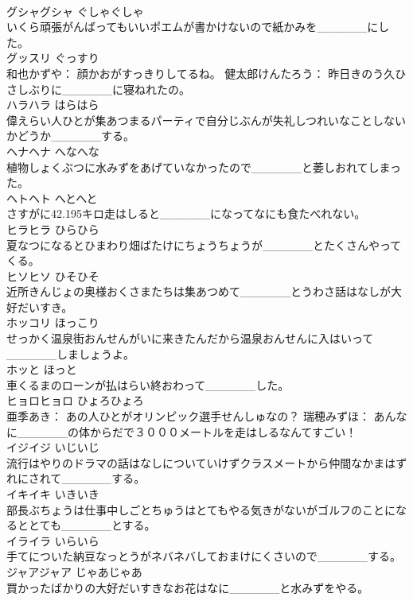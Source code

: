 \documentclass[8pt]{extreport}
\begin{document}
\begin{CJK}{UTF8}{min}
\\	グシャグシャ	ぐしゃぐしゃ	
\\	いくら頑張がんばってもいいポエムが書かけないので紙かみを______にした。	
\\	グッスリ	ぐっすり	
\\	和也かずや： 顔かおがすっきりしてるね。 健太郎けんたろう： 昨日きのう久ひさしぶりに______に寝ねれたの。	
\\	ハラハラ	はらはら	
\\	偉えらい人ひとが集あつまるパーティで自分じぶんが失礼しつれいなことしないかどうか______する。	
\\	ヘナヘナ	へなへな	
\\	植物しょくぶつに水みずをあげていなかったので______と萎しおれてしまった。	
\\	ヘトヘト	へとへと	
\\	さすがに42.195キロ走はしると______になってなにも食たべれない。	
\\	ヒラヒラ	ひらひら	
\\	夏なつになるとひまわり畑ばたけにちょうちょうが______とたくさんやってくる。	
\\	ヒソヒソ	ひそひそ	
\\	近所きんじょの奥様おくさまたちは集あつめて______とうわさ話はなしが大好だいすき。	
\\	ホッコリ	ほっこり	
\\	せっかく温泉街おんせんがいに来きたんだから温泉おんせんに入はいって______しましょうよ。	
\\	ホッと	ほっと	
\\	車くるまのローンが払はらい終おわって______した。	
\\	ヒョロヒョロ	ひょろひょろ	
\\	亜季あき： あの人ひとがオリンピック選手せんしゅなの？ 瑞穂みずほ： あんなに______の体からだで３０００メートルを走はしるなんてすごい！	
\\	イジイジ	いじいじ	
\\	流行はやりのドラマの話はなしについていけずクラスメートから仲間なかまはずれにされて______する。	
\\	イキイキ	いきいき	
\\	部長ぶちょうは仕事中しごとちゅうはとてもやる気きがないがゴルフのことになるととても______とする。	
\\	イライラ	いらいら	
\\	手てについた納豆なっとうがネバネバしておまけにくさいので______する。	
\\	ジャアジャア	じゃあじゃあ	
\\	買かったばかりの大好だいすきなお花はなに______と水みずをやる。	

\end{CJK}
\end{document}
